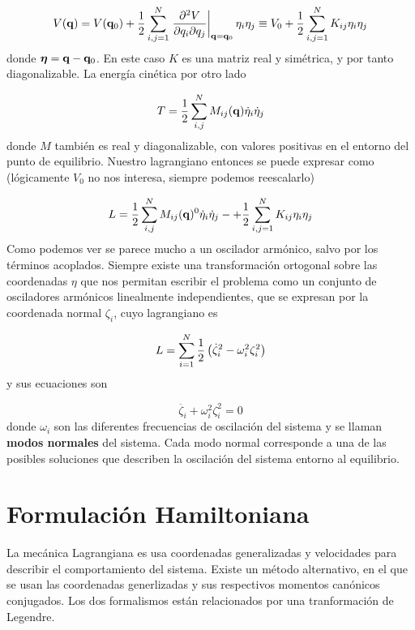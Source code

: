 \begin{equation}
	V(\qn) = V(\qn_0) + \frac{1}{2}\sum_{i,j=1}^{N} \eval{\parciales{^2V}{q_i\partial q_j}}_{\qn=\qn_0} \eta_i \eta_j \equiv V_0 + \frac{1}{2}\sum_{i,j=1}^{N} K_{ij} \eta_i \eta_j
\end{equation}
donde $\boldsymbol{\eta} = \mathbf{q} - \mathbf{q}_0$. En este caso $K$ es una matriz real y simétrica, y por tanto diagonalizable. La energía cinética por otro lado

\begin{equation}
	T=\frac{1}{2}\sum_{i,j}^N M_{ij}(\mathbf{q}) \dot{\eta}_i \dot{\eta}_j
\end{equation}
donde $M$ también es real y diagonalizable, con valores positivas en el entorno del punto de equilibrio. Nuestro lagrangiano entonces se puede expresar como (lógicamente $V_0$ no nos interesa, siempre podemos reescalarlo)

\begin{equation}
	L=\frac{1}{2}\sum_{i,j}^N M_{ij}(\mathbf{q})^0 \dot{\eta}_i \dot{\eta}_j-+ \frac{1}{2}\sum_{i,j=1}^{N} K_{ij} \eta_i \eta_j
\end{equation}
Como podemos ver se parece mucho a un oscilador armónico, salvo por los términos acoplados. Siempre existe una transformación ortogonal sobre las coordenadas $\eta$ que nos permitan escribir el problema como un conjunto de osciladores armónicos linealmente independientes, que se expresan por la coordenada normal $\zeta_i$, cuyo lagrangiano es 

\begin{equation}
	L=\sum_{i=1}^{N} \frac{1}{2}\left( \dot{\zeta}_i^2 - \omega_i^2 \zeta_i^2 \right)
\end{equation}
y sus ecuaciones son 

\begin{equation}
	\ddot{\zeta_i}+\omega_i^2 \zeta_i^2=0
\end{equation}
donde $\omega_i$ son las diferentes frecuencias de oscilación del sistema y se llaman \textbf{modos normales} del sistema. Cada modo normal corresponde a una de las posibles soluciones que describen la oscilación del sistema entorno al equilibrio.

\section{Formulación Hamiltoniana}

La mecánica Lagrangiana es usa coordenadas generalizadas y velocidades para describir el comportamiento del sistema. Existe un método alternativo, en el que se usan las coordenadas generlizadas y sus respectivos momentos canónicos conjugados. Los dos formalismos están relacionados por una tranformación de Legendre.

